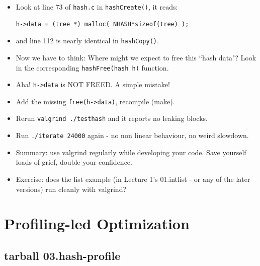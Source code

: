 \documentclass[handout]{beamer}
\newcommand{\pitem}{\pause \item}
\begin{document}
\begin{frame}[fragile]
    \begin{itemize}
       \item
       Look at line 73 of \verb+hash.c+ in \verb+hashCreate()+, it reads:

\begin{verbatim}
h->data = (tree *) malloc( NHASH*sizeof(tree) );
\end{verbatim}
       \item and line 112 is nearly identical in \verb+hashCopy()+.

  \pitem
  Now we have to think: Where might we expect to free this ``hash data"?
  \pause
  Look in the corresponding \verb+hashFree(hash h)+ function.

  \pitem Aha!  \verb+h->data+ is NOT FREED.  A simple mistake!

  \item Add the missing \verb+free(h->data)+, recompile (make).
  \pitem Rerun \verb+valgrind ./testhash+ and it reports no leaking blocks.
  \item Run \verb+./iterate 24000+ again - no non linear behaviour,
  no weird slowdown.

    \pause
    \item
      Summary: \alert{use valgrind regularly while developing your code}.
      Save yourself loads of grief, double your confidence.
    \item
      Exercise: does the list example (in
      Lecture 1's \alert{01.intlist} - or any of the later versions)
      run cleanly with valgrind?
    \end{itemize}
\end{frame}

\section{Profiling-led Optimization}
\subsection{tarball 03.hash-profile}
\end{document}

